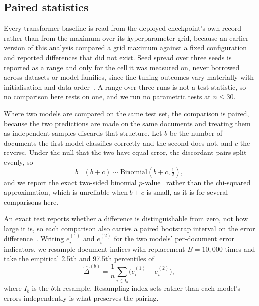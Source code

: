 \subsection{Paired statistics}
\label{sec:stats}

Every transformer baseline is read from the deployed checkpoint's own record rather than from the maximum over its hyperparameter grid, because an earlier version of this analysis compared a grid maximum against a fixed configuration and reported differences that did not exist. Seed spread over three seeds is reported as a range and only for the cell it was measured on, never borrowed across datasets or model families, since fine-tuning outcomes vary materially with initialisation and data order~\cite{Dodge2020fine,Mosbach2020stability}. A range over three runs is not a test statistic, so no comparison here rests on one, and we run no parametric tests at $n \le 30$.

Where two models are compared on the same test set, the comparison is paired, because the two predictions are made on the same documents and treating them as independent samples discards that structure. Let $b$ be the number of documents the first model classifies correctly and the second does not, and $c$ the reverse. Under the null that the two have equal error, the discordant pairs split evenly, so
\begin{equation}
\label{eq:mcnemar}
b \mid (b+c)  \sim  \mathrm{Binomial}\!\left(b+c, \tfrac{1}{2}\right),
\end{equation}
and we report the exact two-sided binomial $p$-value~\cite{McNemar1947note} rather than the chi-squared approximation, which is unreliable when $b+c$ is small, as it is for several comparisons here.

An exact test reports whether a difference is distinguishable from zero, not how large it is, so each comparison also carries a paired bootstrap interval on the error difference~\cite{Efron1979bootstrap}. Writing $e^{(1)}_i$ and $e^{(2)}_i$ for the two models' per-document error indicators, we resample document indices with replacement $B=10{,}000$ times and take the empirical 2.5th and 97.5th percentiles of
\begin{equation}
\label{eq:boot}
\hat{\Delta}^{(b)}  =  \frac{1}{n}\sum_{i \in I_b}\Big(e^{(1)}_i - e^{(2)}_i\Big),
\end{equation}
where $I_b$ is the $b$th resample. Resampling index sets rather than each model's errors independently is what preserves the pairing.

